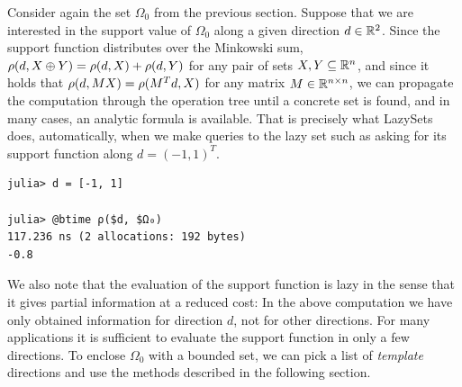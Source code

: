 \smallskip

Consider again the set $\Omega_0$ from the previous section. Suppose that we are interested in the support value of $\Omega_0$ along a given direction $d \in \mathbb{R}^2$.
%
Since the support function distributes over the Minkowski sum, $\rho(d, X \oplus Y) = \rho(d, X) + \rho(d, Y)$ for any pair of sets $X, Y \subseteq \mathbb{R}^n$, and since it holds that $\rho(d, M X) = \rho(M^T d, X)$ for any matrix $M \in \mathbb{R}^{n \times n}$, we can propagate the computation through the operation tree until a concrete set is found, and in many cases, an analytic formula is available.
%
That is precisely what LazySets does, automatically, when we make queries to the lazy set such as asking for its support function along $d = (-1, 1)^T$.

\begin{minipage}{\linewidth}
	\vspace{-\abovedisplayskip}
	\begin{lstlisting}
julia> d = [-1, 1]

julia> @btime ρ($d, $Ω₀)
117.236 ns (2 allocations: 192 bytes)
-0.8
	\end{lstlisting}
\end{minipage}

\smallskip

We also note that the evaluation of the support function is lazy in the sense that it gives partial information at a reduced cost: In the above computation we have only obtained information for direction $d$, not for other directions. For many applications it is sufficient to evaluate the support function in only a few directions. To enclose $\Omega_0$ with a bounded set, we can pick a list of \emph{template} directions and use the methods described in the following section.
